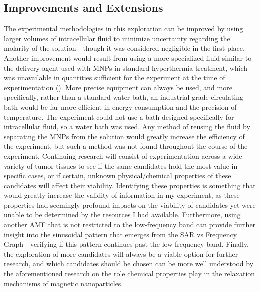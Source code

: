 \documentclass[12pt]{article}
\numberwithin{equation}{section}
\numberwithin{equation}{section}
\begin{document}
\subsection{Improvements and Extensions}
{The experimental methodologies in this exploration can be improved by using larger volumes of intracellular fluid to minimize uncertainty regarding the molarity of the solution - though it was considered negligible in the first place. Another improvement would result from using a more specialized fluid similar to the delivery agent used with MNPs in standard hyperthermia treatment, which was unavailable in quantities sufficient for the experiment at the time of experimentation} (\cite{immune}). {More precise equipment can always be used, and more specifically, rather than a standard water bath, an industrial-grade circulating bath would be far more efficient in energy consumption and the precision of temperature. The experiment could not use a bath designed specifically for intracellular fluid, so a water bath was used. Any method of reusing the fluid by separating the MNPs from the solution would greatly increase the efficiency of the experiment, but such a method was not found throughout the course of the experiment.}
 {Continuing research will consist of experimentation across a wide variety of tumor tissues to see if the same candidates hold the most value in specific cases, or if certain, unknown physical/chemical properties of these candidates will affect their viability. Identifying these properties is something that would greatly increase the validity of information in my experiment, as these properties had seemingly profound impacts on the viability of candidates yet were unable to be determined by the resources I had available. Furthermore, using another AMF that is not restricted to the low-frequency band can provide further insight into the sinusoidal pattern that emerges from the SAR vs Frequency Graph - verifying if this pattern continues past the low-frequency band. Finally, the exploration of more candidates will always be a viable option for further research, and which candidates should be chosen can be more well understood by the aforementioned research on the role chemical properties play in the relaxation mechanisms of magnetic nanoparticles.}

\newpage
\end{document}
